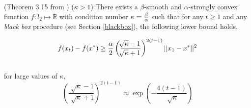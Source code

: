 \documentclass{article}
\begin{document}
\begin{thm}
(Theorem 3.15 from \cite{bubeck})
($\kappa >  1$) There exists a $\beta$-smooth and $\alpha$-strongly convex function $f \colon l_2 \mapsto \mathbb{R}$ with condition number $\kappa = {\beta \over \alpha}$ such that for any $t \geq 1$ and any \emph{black box} procedure (see Section \ref{blackbox}), the following lower bound holds.

\begin{equation}
f(x_t) - f(x^*) \geq {\alpha \over 2}  \left( \frac{\sqrt[]{\kappa} - 1}{\sqrt[]{\kappa} + 1} \right)^{2(t-1)}  ||x_1 - x^*||^2
\end{equation} \\
for large values of $\kappa$, \\
\begin{equation}
 \left(\frac{\sqrt[]{\kappa} - 1}{\sqrt[]{\kappa} + 1} \right)^{2(t-1)} \approx \exp{ \left(-\frac{4(t-1)}{\sqrt[]{\kappa}}\right)}
\end{equation}

\end{thm}
\end{document}
